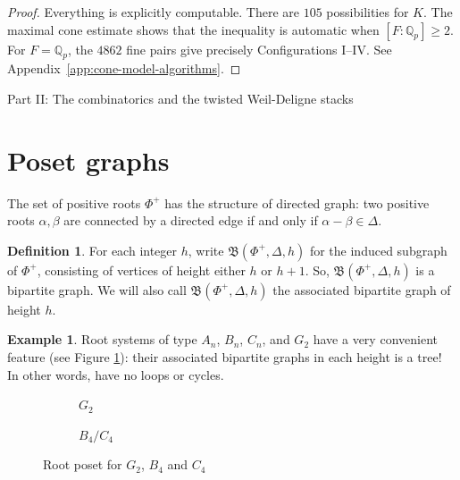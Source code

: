 \documentclass[11pt]{amsart}
\theoremstyle{definition}
\newtheorem{defn}[thm]{Definition}
\newtheorem{example}[thm]{Example}
\newcommand{\Q}{\mathbb{Q}}
\newcommand{\fB}{\mathfrak{B}}
\begin{document}
\begin{proof}
Everything is explicitly computable.
There are $105$ possibilities for $K$.
The maximal cone estimate shows that
the inequality is automatic when $[F:\Q_p]\ge 2$.
For $F=\Q_p$, the $4862$ fine pairs give precisely
Configurations I--IV.
See Appendix~\ref{app:cone-model-algorithms}.
\end{proof}

\newpage
{}
{}

\noindent
{\large Part II: The combinatorics and the twisted Weil-Deligne stacks}

\section{Poset graphs}



The set of positive roots $\Phi^+$
has the structure of directed graph:
two positive roots $\alpha, \beta$
are connected by a directed edge if
and only if
$\alpha-\beta\in \Delta$.


\begin{defn}
For each integer $h$,
write $\fB(\Phi^+, \Delta, h)$
for the induced subgraph of $\Phi^+$,
consisting of vertices of height
either $h$ or $h+1$.
So, $\fB(\Phi^+, \Delta, h)$
is a bipartite graph.
We will also call $\fB(\Phi^+, \Delta, h)$
the associated bipartite graph of height $h$.
\label{def:fB}
\end{defn}

\begin{example}
Root systems of type $A_n$, $B_n$, $C_n$, and $G_2$
have a very convenient feature
(see Figure \ref{figure:G2B4}):
their associated bipartite graphs in each height
is a tree!
In other words, have no loops or cycles.
\begin{figure}[h]
\begin{subfigure}{0.45\textwidth}
\centering
\tikzGtwo
\caption{$G_2$}
\end{subfigure}
\begin{subfigure}{0.45\textwidth}
\centering
\tikzBfour
\caption{$B_4/C_4$}
\end{subfigure}
\caption{Root poset for $G_2$, $B_4$ and $C_4$}
\label{figure:G2B4}
\end{figure}
\end{example}
\end{document}
